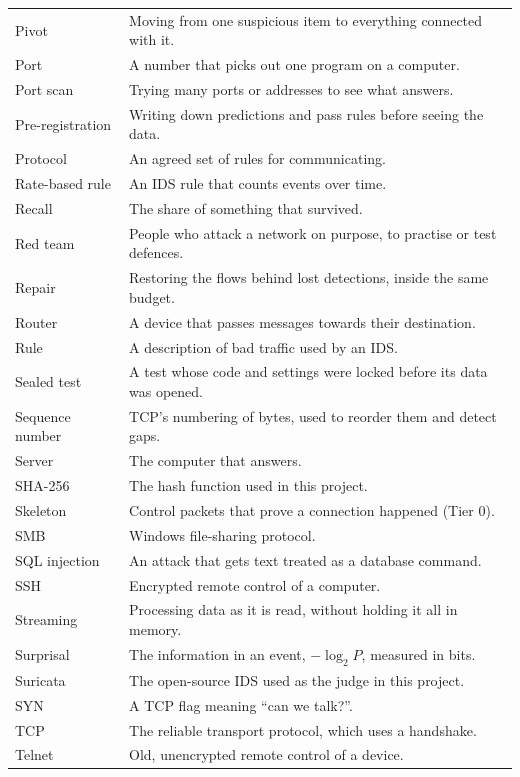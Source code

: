 {\begin{longtable}{>{\raggedright\arraybackslash}p{37mm} >{\raggedright\arraybackslash}p{116mm}}
Pivot & Moving from one suspicious item to everything connected with it.\\
Port & A number that picks out one program on a computer.\\
Port scan & Trying many ports or addresses to see what answers.\\
Pre-registration & Writing down predictions and pass rules before seeing the data.\\
Protocol & An agreed set of rules for communicating.\\
Rate-based rule & An IDS rule that counts events over time.\\
Recall & The share of something that survived.\\
Red team & People who attack a network on purpose, to practise or test defences.\\
Repair & Restoring the flows behind lost detections, inside the same budget.\\
Router & A device that passes messages towards their destination.\\
Rule & A description of bad traffic used by an IDS.\\
Sealed test & A test whose code and settings were locked before its data was opened.\\
Sequence number & TCP's numbering of bytes, used to reorder them and detect gaps.\\
Server & The computer that answers.\\
SHA-256 & The hash function used in this project.\\
Skeleton & Control packets that prove a connection happened (Tier 0).\\
SMB & Windows file-sharing protocol.\\
SQL injection & An attack that gets text treated as a database command.\\
SSH & Encrypted remote control of a computer.\\
Streaming & Processing data as it is read, without holding it all in memory.\\
Surprisal & The information in an event, $-\log_2 P$, measured in bits.\\
Suricata & The open-source IDS used as the judge in this project.\\
SYN & A TCP flag meaning ``can we talk?''.\\
TCP & The reliable transport protocol, which uses a handshake.\\
Telnet & Old, unencrypted remote control of a device.\\

\end{longtable}}
